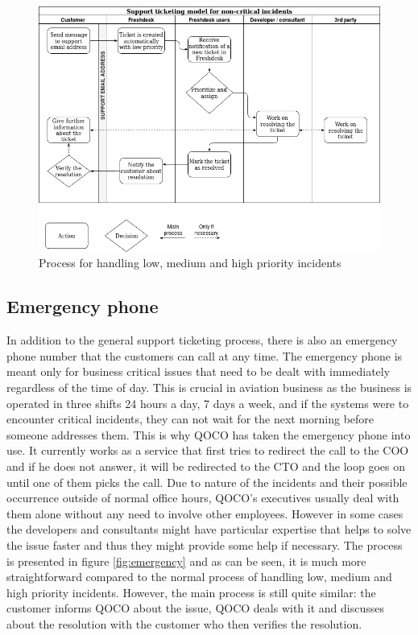 \begin{figure}[H]
	\begin{center}
		\includegraphics[width=.9\textwidth]{images/Current_support_process.png}
		\caption{Process for handling low, medium and high priority incidents}
		\label{fig:ticketing}
	\end{center}
\end{figure}

\subsection{Emergency phone}
In addition to the general support ticketing process, there is also an emergency phone number that the customers can call at any time. The emergency phone is meant only for
business critical issues that need to be dealt with immediately regardless of the time of day. This is crucial in aviation business as the business is operated in three shifts
24 hours a day, 7 days a week, and if the systems were to encounter critical incidents, they can not wait for the next morning before someone addresses them. This is why QOCO has
taken the emergency phone into use. It currently works as a service that first tries to redirect the call to the COO and if he does not answer, it will be redirected to the CTO and
the loop goes on until one of them picks the call. Due to nature of the incidents and their possible occurrence outside of normal office hours, QOCO's executives usually deal with
them alone without any need to involve other employees. However in some cases the developers and consultants might have particular expertise that helps to solve
the issue faster and thus they might provide some help if necessary. The process is presented in figure \ref{fig:emergency} and as can be seen, it is much more straightforward
compared to the normal process of handling low, medium and high priority incidents. However, the main process is still quite similar: the customer informs QOCO about the issue, QOCO deals with it and
discusses about the resolution with the customer who then verifies the resolution.

